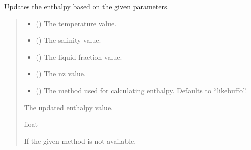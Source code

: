 \documentclass[a4paper,11pt,english,openany]{sphinxmanual}
\begin{document}
\begin{fulllineitems}
\label{\detokenize{api/spyice.update_physical_values:src.spyice.update_physical_values.update_enthalpy}}
\pysigstartsignatures
\pysiglinewithargsret
{}
{\sphinxparamcomma {}\sphinxparamcomma {}\sphinxparamcomma {}\sphinxparamcomma {}}
{}
\pysigstopsignatures
\sphinxAtStartPar
Updates the enthalpy based on the given parameters.
\begin{quote}\begin{description}
\begin{itemize}
\item {} 
\sphinxAtStartPar
{} () \textendash{} The temperature value.

\item {} 
\sphinxAtStartPar
{} () \textendash{} The salinity value.

\item {} 
\sphinxAtStartPar
{} () \textendash{} The liquid fraction value.

\item {} 
\sphinxAtStartPar
{} () \textendash{} The nz value.

\item {} 
\sphinxAtStartPar
{} (\sphinxstyleliteralemphasis{\sphinxupquote{, }}) \textendash{} The method used for calculating enthalpy. Defaults to “likebuffo”.

\end{itemize}

\sphinxAtStartPar
The updated enthalpy value.

\sphinxAtStartPar
float

\sphinxAtStartPar
{} \textendash{} If the given method is not available.

\end{description}\end{quote}

\end{fulllineitems}
\end{document}

